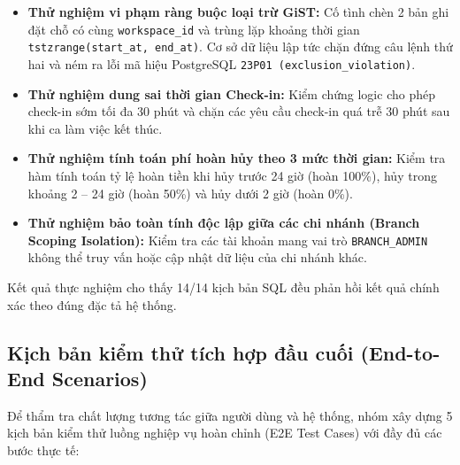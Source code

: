 \begin{itemize}
    \item \textbf{Thử nghiệm vi phạm ràng buộc loại trừ GiST:} Cố tình chèn 2 bản ghi đặt chỗ có cùng \texttt{workspace\_id} và trùng lặp khoảng thời gian \texttt{tstzrange(start\_at, end\_at)}. Cơ sở dữ liệu lập tức chặn đứng câu lệnh thứ hai và ném ra lỗi mã hiệu PostgreSQL \texttt{23P01 (exclusion\_violation)}.
    \item \textbf{Thử nghiệm dung sai thời gian Check-in:} Kiểm chứng logic cho phép check-in sớm tối đa 30 phút và chặn các yêu cầu check-in quá trễ 30 phút sau khi ca làm việc kết thúc.
    \item \textbf{Thử nghiệm tính toán phí hoàn hủy theo 3 mức thời gian:} Kiểm tra hàm tính toán tỷ lệ hoàn tiền khi hủy trước 24 giờ (hoàn 100\%), hủy trong khoảng 2 -- 24 giờ (hoàn 50\%) và hủy dưới 2 giờ (hoàn 0\%).
    \item \textbf{Thử nghiệm bảo toàn tính độc lập giữa các chi nhánh (Branch Scoping Isolation):} Kiểm tra các tài khoản mang vai trò \texttt{BRANCH\_ADMIN} không thể truy vấn hoặc cập nhật dữ liệu của chi nhánh khác.
\end{itemize}

Kết quả thực nghiệm cho thấy 14/14 kịch bản SQL đều phản hồi kết quả chính xác theo đúng đặc tả hệ thống.

\subsection{Kịch bản kiểm thử tích hợp đầu cuối (End-to-End Scenarios)}

Để thẩm tra chất lượng tương tác giữa người dùng và hệ thống, nhóm xây dựng 5 kịch bản kiểm thử luồng nghiệp vụ hoàn chỉnh (E2E Test Cases) với đầy đủ các bước thực tế:

